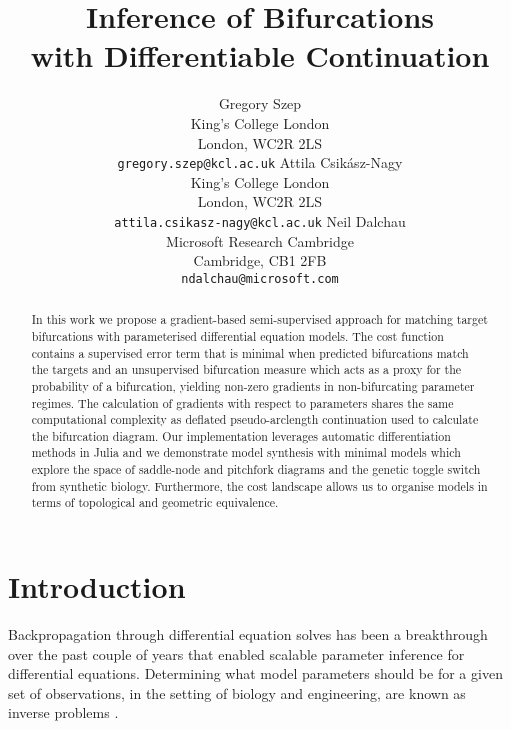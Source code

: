

\title{Inference of Bifurcations\\with Differentiable Continuation}
\author{
        Gregory Szep\\King's College London\\London, WC2R 2LS\\
        \texttt{gregory.szep@kcl.ac.uk}
    \And
        Attila Csik\'asz-Nagy\\King's College London\\London, WC2R 2LS\\
        \texttt{attila.csikasz-nagy@kcl.ac.uk}
    \And
        Neil Dalchau\\Microsoft Research Cambridge\\Cambridge, CB1 2FB\\
        \texttt{ndalchau@microsoft.com}
}



\maketitle

\begin{abstract}
    In this work we propose a gradient-based semi-supervised approach for matching target bifurcations with parameterised differential equation models. The cost function contains a supervised error term that is minimal when predicted bifurcations match the targets and an unsupervised bifurcation measure which acts as a proxy for the probability of a bifurcation, yielding non-zero gradients in non-bifurcating parameter regimes. The calculation of gradients with respect to parameters shares the same computational complexity as deflated pseudo-arclength continuation used to calculate the bifurcation diagram. Our implementation leverages automatic differentiation methods in Julia and we demonstrate model synthesis with minimal models which explore the space of saddle-node and pitchfork diagrams and the genetic toggle switch from synthetic biology. Furthermore, the cost landscape allows us to  organise models in terms of topological and geometric equivalence.
\end{abstract}

\section{Introduction}

Backpropagation through differential equation solves has been a breakthrough over the past couple of years \cite{Chen2018NeuralEquations,Rackauckas2019DiffEqFlux.jl-AEquations} that enabled scalable parameter inference for differential equations. Determining what model parameters should be for a given set of observations, in the setting of biology and engineering, are known as inverse problems \cite{Abdulla2009InverseBiology}.

